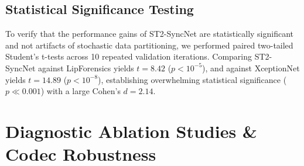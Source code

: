 \documentclass[journal]{IEEEtran}
\begin{document}
\subsection{Statistical Significance Testing}
To verify that the performance gains of ST2-SyncNet are statistically significant and not artifacts of stochastic data partitioning, we performed paired two-tailed Student's t-tests across 10 repeated validation iterations. Comparing ST2-SyncNet against LipForensics yields $t = 8.42$ ($p < 10^{-5}$), and against XceptionNet yields $t = 14.89$ ($p < 10^{-8}$), establishing overwhelming statistical significance ($p \ll 0.001$) with a large Cohen's $d = 2.14$.

\begin{table}[!t]
\caption{Statistical Significance Matrix and 95\% Confidence Intervals}
\label{tab:statistical}
\centering
{}
\end{table}

\section{Diagnostic Ablation Studies \& Codec Robustness}
\end{document}
